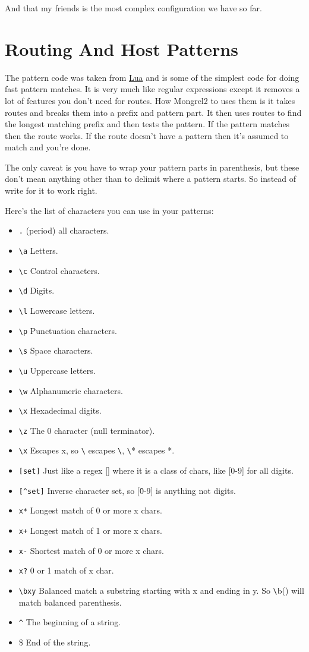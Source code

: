 And that my friends is the most complex configuration we have so far.


\section{Routing And Host Patterns}

The pattern code was taken from \href{http://www.lua.org/}{Lua} and is some of the simplest 
code for doing fast pattern matches.  It is very much like regular expressions except it removes
a lot of features you don't need for routes.  How Mongrel2 to uses them is it takes routes and breaks
them into a prefix and pattern part.  It then uses routes to find the longest matching prefix and then
tests the pattern.  If the pattern matches then the route works.  If the route doesn't have a pattern
then it's assumed to match and you're done.

The only caveat is you have to wrap your pattern parts in parenthesis, but these don't mean anything
other than to delimit where a pattern starts.  So instead of  write 
for it to work right.

Here's the list of characters you can use in your patterns:

\begin{itemize}
\item \verb|.| (period) all characters.
\item \verb|\a| Letters.
\item \verb|\c| Control characters.
\item \verb|\d| Digits.
\item \verb|\l| Lowercase letters.
\item \verb|\p| Punctuation characters.
\item \verb|\s| Space characters.
\item \verb|\u| Uppercase letters.
\item \verb|\w| Alphanumeric characters.
\item \verb|\x| Hexadecimal digits.
\item \verb|\z| The 0 character (null terminator).
\item \verb|\x| Escapes x, so \verb|\| escapes \verb|\|, \verb|\|* escapes *.
\item \verb|[set]| Just like a regex [] where it is a class of chars, like [0-9] for all digits.
\item \verb|[^set]| Inverse character set, so [\^0-9] is anything not digits.
\item \verb|x*| Longest match of 0 or more x chars.
\item \verb|x+| Longest match of 1 or more x chars.
\item \verb|x-| Shortest match of 0 or more x chars.
\item \verb|x?| 0 or 1 match of x char.
\item \verb|\bxy| Balanced match a substring starting with x and ending in y.  So \verb|\|b() will match balanced parenthesis.
\item \verb|^| The beginning of a string.
\item \$ End of the string.
\end{itemize}

